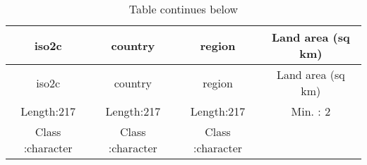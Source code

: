 \documentclass[
]{article}
\begin{document}
\begin{longtable}[]{@{}cccc@{}}
\caption{Table continues below}\tabularnewline
\toprule
\begin{minipage}[b]{0.22\columnwidth}\centering
iso2c\strut
\end{minipage} & \begin{minipage}[b]{0.22\columnwidth}\centering
country\strut
\end{minipage} & \begin{minipage}[b]{0.22\columnwidth}\centering
region\strut
\end{minipage} & \begin{minipage}[b]{0.23\columnwidth}\centering
Land area (sq km)\strut
\end{minipage}\tabularnewline
\midrule
\endfirsthead
\toprule
\begin{minipage}[b]{0.22\columnwidth}\centering
iso2c\strut
\end{minipage} & \begin{minipage}[b]{0.22\columnwidth}\centering
country\strut
\end{minipage} & \begin{minipage}[b]{0.22\columnwidth}\centering
region\strut
\end{minipage} & \begin{minipage}[b]{0.23\columnwidth}\centering
Land area (sq km)\strut
\end{minipage}\tabularnewline
\midrule
\endhead
\begin{minipage}[t]{0.22\columnwidth}\centering
Length:217\strut
\end{minipage} & \begin{minipage}[t]{0.22\columnwidth}\centering
Length:217\strut
\end{minipage} & \begin{minipage}[t]{0.22\columnwidth}\centering
Length:217\strut
\end{minipage} & \begin{minipage}[t]{0.23\columnwidth}\centering
Min. : 2\strut
\end{minipage}\tabularnewline
\begin{minipage}[t]{0.22\columnwidth}\centering
Class :character\strut
\end{minipage} & \begin{minipage}[t]{0.22\columnwidth}\centering
Class :character\strut
\end{minipage} & \begin{minipage}[t]{0.22\columnwidth}\centering
Class :character\strut
\end{minipage} & \begin{minipage}[t]{0.23\columnwidth}\centering

\end{minipage}
\end{longtable}
\end{document}
